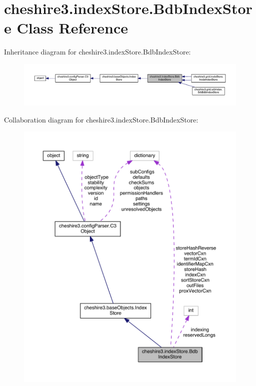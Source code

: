 \hypertarget{classcheshire3_1_1index_store_1_1_bdb_index_store}{\section{cheshire3.\-index\-Store.\-Bdb\-Index\-Store Class Reference}
\label{classcheshire3_1_1index_store_1_1_bdb_index_store}
}


Inheritance diagram for cheshire3.\-index\-Store.\-Bdb\-Index\-Store\-:
\nopagebreak
\begin{figure}[H]
\begin{center}
\leavevmode
\includegraphics[width=350pt]{classcheshire3_1_1index_store_1_1_bdb_index_store__inherit__graph}
\end{center}
\end{figure}


Collaboration diagram for cheshire3.\-index\-Store.\-Bdb\-Index\-Store\-:
\nopagebreak
\begin{figure}[H]
\begin{center}
\leavevmode
\includegraphics[width=350pt]{classcheshire3_1_1index_store_1_1_bdb_index_store__coll__graph}
\end{center}
\end{figure}
